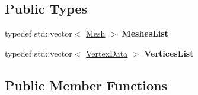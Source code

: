 \subsection*{Public Types}
\begin{DoxyCompactItemize}
\item 
\mbox{\label{classModel_a1383a9f3b27fa6afaeec834f98787469}} 
typedef std\+::vector$<$ \hyperlink{classMesh}{Mesh} $>$ {\bfseries Meshes\+List}
\item 
\mbox{\label{classModel_acd01edc2653c0488d1cdb852b3b5312f}} 
typedef std\+::vector$<$ \hyperlink{structVertexData}{Vertex\+Data} $>$ {\bfseries Vertices\+List}
\end{DoxyCompactItemize}
\subsection*{Public Member Functions}
